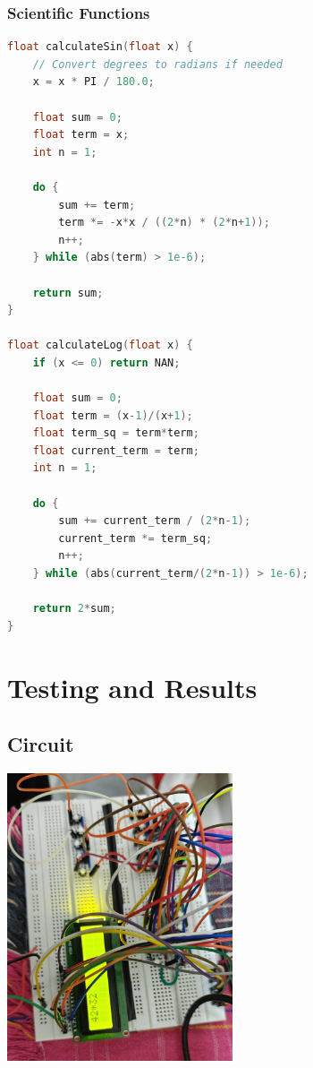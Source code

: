 \documentclass{article}
\begin{document}
\subsubsection{Scientific Functions}
\begin{lstlisting}[language=C++]
float calculateSin(float x) {
    // Convert degrees to radians if needed
    x = x * PI / 180.0;
    
    float sum = 0;
    float term = x;
    int n = 1;
    
    do {
        sum += term;
        term *= -x*x / ((2*n) * (2*n+1));
        n++;
    } while (abs(term) > 1e-6);
    
    return sum;
}

float calculateLog(float x) {
    if (x <= 0) return NAN;
    
    float sum = 0;
    float term = (x-1)/(x+1);
    float term_sq = term*term;
    float current_term = term;
    int n = 1;
    
    do {
        sum += current_term / (2*n-1);
        current_term *= term_sq;
        n++;
    } while (abs(current_term/(2*n-1)) > 1e-6);
    
    return 2*sum;
}
\end{lstlisting}

\section{Testing and Results}

\subsection{Circuit}

\begin{center}
    \includegraphics[width=0.5\textwidth]{Figs/Scical.jpg} %
\end{center}
\end{document}
